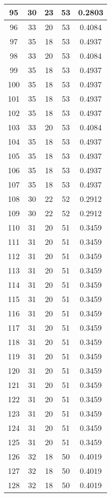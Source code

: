 \documentclass[letterpaper, 12pt]{article}
\begin{document}
\begin{longtable}{|c|c|c|c|c|}
\hline
95 & 30 & 23 & 53 & 0.2803 \\
\hline
96 & 33 & 20 & 53 & 0.4084 \\
\hline
97 & 35 & 18 & 53 & 0.4937 \\
\hline
98 & 33 & 20 & 53 & 0.4084 \\
\hline
99 & 35 & 18 & 53 & 0.4937 \\
\hline
100 & 35 & 18 & 53 & 0.4937 \\
\hline
101 & 35 & 18 & 53 & 0.4937 \\
\hline
102 & 35 & 18 & 53 & 0.4937 \\
\hline
103 & 33 & 20 & 53 & 0.4084 \\
\hline
104 & 35 & 18 & 53 & 0.4937 \\
\hline
105 & 35 & 18 & 53 & 0.4937 \\
\hline
106 & 35 & 18 & 53 & 0.4937 \\
\hline
107 & 35 & 18 & 53 & 0.4937 \\
\hline
108 & 30 & 22 & 52 & 0.2912 \\
\hline
109 & 30 & 22 & 52 & 0.2912 \\
\hline
110 & 31 & 20 & 51 & 0.3459 \\
\hline
111 & 31 & 20 & 51 & 0.3459 \\
\hline
112 & 31 & 20 & 51 & 0.3459 \\
\hline
113 & 31 & 20 & 51 & 0.3459 \\
\hline
114 & 31 & 20 & 51 & 0.3459 \\
\hline
115 & 31 & 20 & 51 & 0.3459 \\
\hline
116 & 31 & 20 & 51 & 0.3459 \\
\hline
117 & 31 & 20 & 51 & 0.3459 \\
\hline
118 & 31 & 20 & 51 & 0.3459 \\
\hline
119 & 31 & 20 & 51 & 0.3459 \\
\hline
120 & 31 & 20 & 51 & 0.3459 \\
\hline
121 & 31 & 20 & 51 & 0.3459 \\
\hline
122 & 31 & 20 & 51 & 0.3459 \\
\hline
123 & 31 & 20 & 51 & 0.3459 \\
\hline
124 & 31 & 20 & 51 & 0.3459 \\
\hline
125 & 31 & 20 & 51 & 0.3459 \\
\hline
126 & 32 & 18 & 50 & 0.4019 \\
\hline
127 & 32 & 18 & 50 & 0.4019 \\
\hline
128 & 32 & 18 & 50 & 0.4019 \\

\end{longtable}
\end{document}
